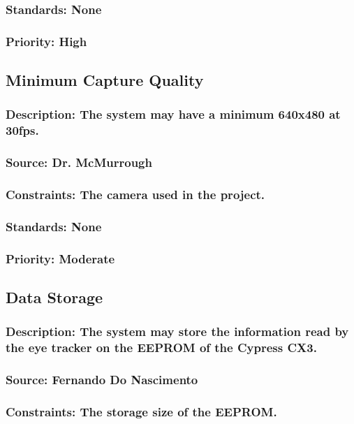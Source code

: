 \subsubsection{Standards: None}
\subsubsection{Priority: High}

\subsection{Minimum Capture Quality}
\subsubsection{Description: The system may have a minimum 640x480 at 30fps.}
\subsubsection{Source: Dr. McMurrough}
\subsubsection{Constraints: The camera used in the project.}
\subsubsection{Standards: None}
\subsubsection{Priority: Moderate}

\subsection{Data Storage}
\subsubsection{Description: The system may store the information read by the eye tracker on the EEPROM of the Cypress CX3.}
\subsubsection{Source: Fernando Do Nascimento}
\subsubsection{Constraints: The storage size of the EEPROM.}
